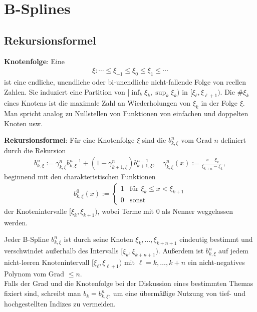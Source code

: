 \chapter{%
    B-Splines%
}

\section{%
    Rekursionsformel%
}

\textbf{Knotenfolge}:
Eine 
\begin{align*}
    \xi\colon \dotsb \le \xi_{-1} \le \xi_0 \le \xi_1 \le \dotsb
\end{align*}
ist eine endliche, unendliche oder bi-unendliche nicht-fallende Folge von reellen Zahlen.
Sie induziert eine Partition von $[\inf_k \xi_k, \sup_k \xi_k)$ in 
$[\xi_\ell, \xi_{\ell+1})$.
Die  $\#\xi_k$ eines Knotens ist die maximale Zahl an Wiederholungen von
$\xi_k$ in der Folge $\xi$.
Man spricht analog zu Nullstellen von Funktionen von einfachen und doppelten Knoten usw.

\linie

\textbf{Rekursionsformel}:
Für eine Knotenfolge $\xi$ sind die  $b_{k,\xi}^n$ vom Grad $n$ definiert
durch die Rekursion
\begin{align*}
    b_{k,\xi}^n := \gamma_{k,\xi}^n b_{k,\xi}^{n-1} +
    (1 - \gamma_{k+1,\xi}^n) b_{k+1,\xi}^{n-1},\quad
    \gamma_{k,\xi}^n(x) := \frac{x - \xi_k}{\xi_{k+n} - \xi_k},
\end{align*}
beginnend mit den charakteristischen Funktionen
\begin{align*}
    b_{k,\xi}^0(x) :=
    \begin{cases}1 & \text{für } \xi_k \le x < \xi_{k+1}\\0 & \text{sonst}\end{cases}
\end{align*}
der Knotenintervalle $[\xi_k, \xi_{k+1})$, wobei Terme mit $0$ als Nenner weggelassen werden.

Jeder B-Spline $b_{k,\xi}^n$ ist durch seine Knoten $\xi_k, \dotsc, \xi_{k+n+1}$ eindeutig
bestimmt und verschwindet außerhalb des Intervalls $[\xi_k, \xi_{k+n+1})$.
Außerdem ist $b_{k,\xi}^n$ auf jedem nicht-leeren Knotenintervall $[\xi_\ell, \xi_{\ell+1})$ mit
$\ell = k, \dotsc, k + n$ ein nicht-negatives Polynom vom Grad $\le n$.\\
Falls der Grad und die Knotenfolge bei der Diskussion eines bestimmten Themas fixiert sind,
schreibt man $b_k = b_{k,\xi}^n$, um eine übermäßige Nutzung von tief- und hochgestellten Indizes
zu vermeiden.

